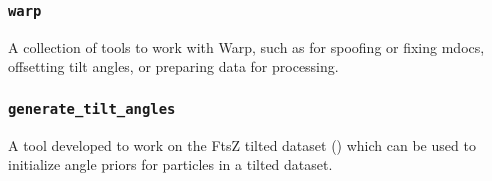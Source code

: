 \subsubsection{\texttt{warp}}
A collection of tools to work with Warp, such as for spoofing or fixing mdocs, offsetting tilt angles, or preparing data for processing.

\subsubsection{\texttt{generate\_tilt\_angles}}\label{stemia_angles}
A tool developed to work on the FtsZ tilted dataset () which can be used to initialize angle priors for particles in a tilted dataset.
